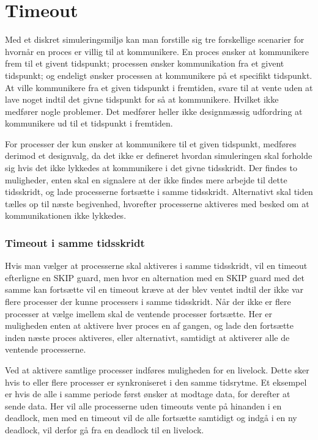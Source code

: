 \section{Timeout} 
\begin{shaded}
Med et diskret simuleringsmiljø kan man forstille sig tre forskellige scenarier for  hvornår  en proces er villig
til at kommunikere. En proces ønsker at kommunikere  frem til et givent tidspunkt; processen ønsker kommunikation fra et givent tidspunkt; og endeligt ønsker processen at kommunikere på et specifikt tidspunkt.
At ville kommunikere fra et given tidspunkt i fremtiden, svare til at   
vente uden at lave noget indtil det givne tidspunkt for så at kommunikere. Hvilket ikke medfører nogle problemer. Det medfører heller ikke  designmæssig udfordring at kommunikere ud til et tidspunkt i fremtiden.

For processer der kun ønsker at kommunikere til et given tidspunkt,
medføres derimod et designvalg, da det ikke er defineret hvordan simuleringen skal forholde sig hvis det ikke lykkedes at kommunikere   
i det givne tidsskridt. Der findes to muligheder, enten skal \sched     
en signalere at der ikke findes mere arbejde til dette tidsskridt, og   
lade processerne fortsætte i samme tidsskridt. Alternativt skal tiden   
tælles op til næste begivenhed, hvorefter processerne aktiveres med besked om  at    
kommunikationen ikke lykkedes. 
\subsubsection{Timeout i samme tidsskridt} 
Hvis man vælger at processerne skal aktiveres i samme tidsskridt, vil en timeout
efterligne en SKIP guard, men hvor en alternation med en SKIP guard med
det samme kan fortsætte vil en timeout kræve at der blev ventet indtil
der ikke var flere processer der kunne processers i samme tidsskridt.
Når der ikke er flere processer at vælge imellem skal de ventende
processer fortsætte. Her er muligheden enten at aktivere hver proces
en af gangen, og lade den fortsætte inden næste proces aktiveres,
eller alternativt, samtidigt at aktiverer alle de ventende processerne.

Ved at aktivere samtlige processer indføres muligheden for en
livelock. Dette sker hvis to eller flere processer er synkroniseret i
den samme tidsrytme. Et eksempel er hvis de alle i samme periode først
ønsker at modtage data, for derefter at sende data. Her vil alle
processerne uden timeouts vente på hinanden i en deadlock, men med en
timeout vil de alle fortsætte samtidigt og indgå i en ny deadlock,
\pycsp vil derfor gå fra en deadlock til en livelock. 


\end{shaded}
